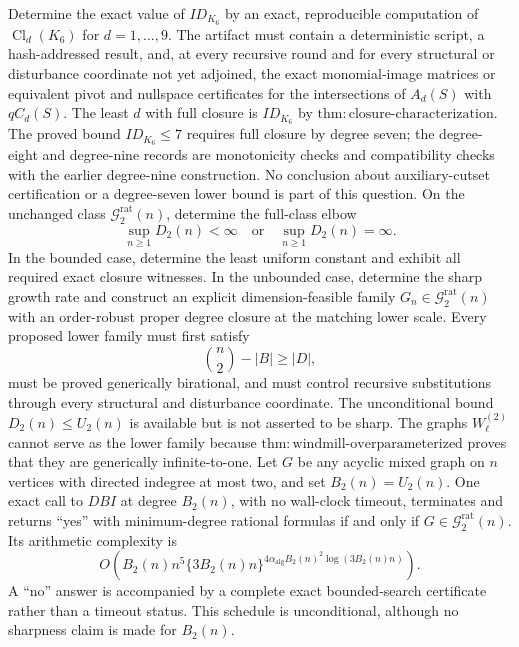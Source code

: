 Determine the exact value of \(ID_{K_6}\) by an exact, reproducible computation of \(\operatorname{Cl}_d(K_6)\) for \(d=1,\ldots,9\).  The artifact must contain a deterministic script, a hash-addressed result, and, at every recursive round and for every structural or disturbance coordinate not yet adjoined, the exact monomial-image matrices or equivalent pivot and nullspace certificates for the intersections of \(A_d(S)\) with \(qC_d(S)\).  The least \(d\) with full closure is \(ID_{K_6}\) by \(\mathrm{thm:closure\mbox{-}characterization}\).  The proved bound \(ID_{K_6}\leq7\) requires full closure by degree seven; the degree-eight and degree-nine records are monotonicity checks and compatibility checks with the earlier degree-nine construction.  No conclusion about auxiliary-cutset certification or a degree-seven lower bound is part of this question.
On the unchanged class \(\mathcal G_{2}^{\mathrm{rat}}(n)\), determine the full-class elbow
\[
 \sup_{n\geq1}D_2(n)<\infty\quad\text{or}\quad \sup_{n\geq1}D_2(n)=\infty.
\]
In the bounded case, determine the least uniform constant and exhibit all required exact closure witnesses.  In the unbounded case, determine the sharp growth rate and construct an explicit dimension-feasible family \(G_n\in\mathcal G_{2}^{\mathrm{rat}}(n)\) with an order-robust proper degree closure at the matching lower scale.  Every proposed lower family must first satisfy
\[
 \binom n2-|B|\geq |D|,
\]
must be proved generically birational, and must control recursive substitutions through every structural and disturbance coordinate.  The unconditional bound \(D_2(n)\leq U_2(n)\) is available but is not asserted to be sharp.  The graphs \(W_{\ell}^{(2)}\) cannot serve as the lower family because \(\mathrm{thm:windmill\mbox{-}overparameterized}\) proves that they are generically infinite-to-one.
Let \(G\) be any acyclic mixed graph on \(n\) vertices with directed indegree at most two, and set \(B_2(n)=U_2(n)\).  One exact call to \(DBI\) at degree \(B_2(n)\), with no wall-clock timeout, terminates and returns ``yes'' with minimum-degree rational formulas if and only if \(G\in\mathcal G_{2}^{\mathrm{rat}}(n)\).  Its arithmetic complexity is
\[
 O\!\left(B_2(n)n^5\{3B_2(n)n\}^{4\alpha_{\mathrm{alg}}B_2(n)^2\log(3B_2(n)n)}\right).
\]
A ``no'' answer is accompanied by a complete exact bounded-search certificate rather than a timeout status.  This schedule is unconditional, although no sharpness claim is made for \(B_2(n)\).
